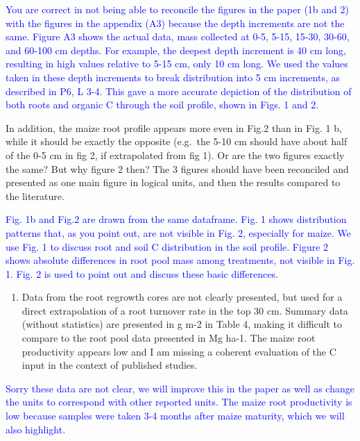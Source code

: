 \documentclass[]{article}
\providecommand{\tightlist}{%
  \setlength{\itemsep}{0pt}\setlength{\parskip}{0pt}}
\begin{document}
\textcolor{blue}{You are correct in not being able to reconcile the figures in the paper (1b and 2) with the figures in the appendix (A3) because the depth increments are not the same. Figure A3 shows the actual data, mass collected at 0-5, 5-15, 15-30, 30-60, and 60-100 cm depths. For example, the deepest depth increment is 40 cm long, resulting in high values relative to 5-15 cm, only 10 cm long. We used the values taken in these depth increments to break distribution into 5 cm increments, as described in P6, L 3-4. This gave a more accurate depiction of the distribution of both roots and organic C through the soil profile, shown in Figs. 1 and 2.}

In addition, the maize root profile appears more even in Fig.2 than in
Fig. 1 b, while it should be exactly the opposite (e.g.~the 5-10 cm
should have about half of the 0-5 cm in fig 2, if extrapolated from fig
1). Or are the two figures exactly the same? But why figure 2 then? The
3 figures should have been reconciled and presented as one main figure
in logical units, and then the results compared to the literature.

\textcolor{blue}{Fig. 1b and Fig.2 are drawn from the same dataframe. Fig. 1 shows distribution patterns that, as you point out, are not visible in Fig. 2, especially for maize. We use Fig. 1 to discuss root and soil C distribution in the soil profile. Figure 2 shows absolute differences in root pool mass among treatments, not visible in Fig. 1. Fig. 2 is used to point out and discuss these basic differences.}

\begin{enumerate}
\def\labelenumi{\arabic{enumi})}
\setcounter{enumi}{2}
\tightlist
\item
  Data from the root regrowth cores are not clearly presented, but used
  for a direct extrapolation of a root turnover rate in the top 30 cm.
  Summary data (without statistics) are presented in g m-2 in Table 4,
  making it difficult to compare to the root pool data presented in Mg
  ha-1. The maize root productivity appears low and I am missing a
  coherent evaluation of the C input in the context of published
  studies.
\end{enumerate}

\textcolor{blue}{Sorry these data are not clear, we will improve this in the paper as well as change the units to correspond with other reported units. The maize root productivity is low because samples were taken 3-4 months after maize maturity, which we will also highlight.}
\end{document}
